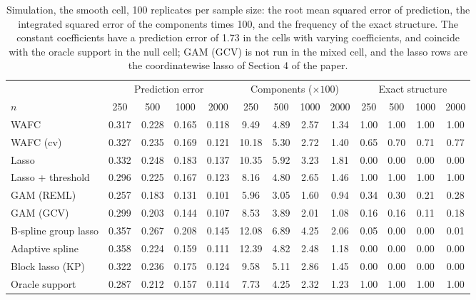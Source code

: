 \begin{table}[tp]
\color{colR1}
\caption{Simulation, the smooth cell, 100 replicates per sample size: the root mean squared error of prediction, the integrated squared error of the components times 100, and the frequency of the exact structure. The constant coefficients have a prediction error of 1.73 in the cells with varying coefficients, and coincide with the oracle support in the null cell; GAM (GCV) is not run in the mixed cell, and the lasso rows are the coordinatewise lasso of Section 4 of the paper.}
\label{tab:sim-sizes}
\centering
\footnotesize
\setlength{\tabcolsep}{3pt}
\begin{tabular}{l cccc cccc cccc}
\hline
 & \multicolumn{4}{c}{Prediction error} & \multicolumn{4}{c}{Components ($\times 100$)} & \multicolumn{4}{c}{Exact structure} \\
$n$ & 250 & 500 & 1000 & 2000 & 250 & 500 & 1000 & 2000 & 250 & 500 & 1000 & 2000 \\
\hline
WAFC & 0.317 & 0.228 & 0.165 & 0.118 & 9.49 & 4.89 & 2.57 & 1.34 & 1.00 & 1.00 & 1.00 & 1.00 \\
WAFC (cv) & 0.327 & 0.235 & 0.169 & 0.121 & 10.18 & 5.30 & 2.72 & 1.40 & 0.65 & 0.70 & 0.71 & 0.77 \\
Lasso & 0.332 & 0.248 & 0.183 & 0.137 & 10.35 & 5.92 & 3.23 & 1.81 & 0.00 & 0.00 & 0.00 & 0.00 \\
Lasso + threshold & 0.296 & 0.225 & 0.167 & 0.123 & 8.16 & 4.80 & 2.65 & 1.46 & 1.00 & 1.00 & 1.00 & 1.00 \\
GAM (REML) & 0.257 & 0.183 & 0.131 & 0.101 & 5.96 & 3.05 & 1.60 & 0.94 & 0.34 & 0.30 & 0.21 & 0.28 \\
GAM (GCV) & 0.299 & 0.203 & 0.144 & 0.107 & 8.53 & 3.89 & 2.01 & 1.08 & 0.16 & 0.16 & 0.11 & 0.18 \\
B-spline group lasso & 0.357 & 0.267 & 0.208 & 0.145 & 12.08 & 6.89 & 4.25 & 2.06 & 0.05 & 0.00 & 0.00 & 0.01 \\
Adaptive spline & 0.358 & 0.224 & 0.159 & 0.111 & 12.39 & 4.82 & 2.48 & 1.18 & 0.00 & 0.00 & 0.00 & 0.00 \\
Block lasso (KP) & 0.322 & 0.236 & 0.175 & 0.124 & 9.58 & 5.11 & 2.86 & 1.45 & 0.00 & 0.00 & 0.00 & 0.00 \\
Oracle support & 0.287 & 0.212 & 0.157 & 0.114 & 7.73 & 4.25 & 2.32 & 1.23 & 1.00 & 1.00 & 1.00 & 1.00 \\
\hline
\end{tabular}
\end{table}

